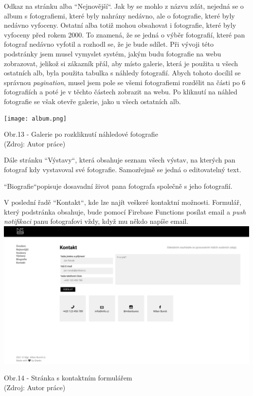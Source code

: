 \documentclass[12pt,a4paper]{report}
\begin{document}
  Odkaz na stránku alba ``Nejnovější``. 
  Jak by se mohlo z názvu zdát, nejedná se o album s fotografiemi, které byly nahrány nedávno, ale 
  o fotografie, které byly nedávno vyfoceny. Ostatní alba totiž mohou obsahovat i fotografie, které byly
  vyfoceny před rokem 2000. To znamená, že se
  jedná o výběr fotografií, které pan fotograf nedávno vyfotil a rozhodl se, že je bude sdílet. Při
  vývoji této podstránky jsem musel vymyslet systém, jakým budu fotografie na webu zobrazovat,
  jelikož si zákazník přál, aby místo galerie, která je použita u všech ostatních alb, byla použita
  tabulka s náhledy fotografií. Abych tohoto docílil se správnou \emph{pagination}, musel jsem pole
  se všemi fotografiemi rozdělit na části po 6 fotografiích a poté je v těchto částech zobrazit na
  webu. Po kliknutí na náhled fotografie se však otevře galerie, jako u všech ostatních alb.
  
  \vspace*{0.5cm}
  \noindent\texttt{[image: album.png]}
  \begin{center}
    Obr.13 - Galerie po rozkliknutí náhledové fotografie  \\
    (Zdroj: Autor práce)
  \end{center}
  \vspace*{0.5cm}
 
  Dále stránku ``Výstavy``, která obsahuje seznam všech výstav, na kterých pan fotograf kdy vystavoval
  své fotografie. Samozřejmě se jedná o editovatelný text.
  
  ``Biografie``\space popisuje dosavadní život pana fotografa společně s jeho fotografií.
  
  V poslední řadě ``Kontakt``, kde lze najít veškeré kontaktní možnosti. Formulář, který podstránka
  obsahuje, bude pomocí Firebase Functions posílat email a \emph{push notifikaci} panu fotografovi vždy,
  když mu někdo napíše email.
  \vfill
  \vspace*{0.5cm}
  \noindent\includegraphics[width=\linewidth]{contact.png}
  \begin{center}
    Obr.14 -  Stránka s kontaktním formulářem \\
    (Zdroj: Autor práce)
  \end{center}
  \vspace*{0.5cm}
\end{document}
